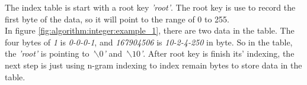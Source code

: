 The index table is start with a root key \textit{'root'}. The root key is use to record the first byte of the data, so it will point to the range of 0 to 255.\\

In figure \ref{fig:algorithm:integer:example_1}, there are two data in the table. The four bytes of \textit{1} is \textit{0-0-0-1}, and \textit{167904506} is \textit{10-2-4-250} in byte. So in the table, the \textit{'root'} is pointing to \textit{'$\backslash0$'} and \textit{'$\backslash10$'}. After root key is finish its' indexing, the next step is just using n-gram indexing to index remain bytes to store data in the table.\\












\clearpage

